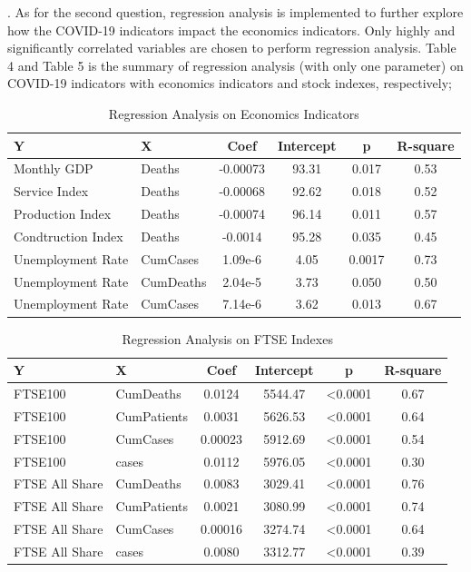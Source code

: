 \documentclass[12pt, a4paper]{report}
\begin{document}
. As for the second question, regression analysis is implemented to further explore how the COVID-19 indicators impact 
the economics indicators. Only highly and significantly correlated variables are chosen to perform regression analysis.
Table 4 and Table 5 is the summary of regression analysis (with only one parameter) on COVID-19 indicators with economics indicators 
and stock indexes, respectively;\par
\noindent

\begin{table}[H]
    \begin{center}
    \caption{Regression Analysis on Economics Indicators}
    \begin{tabular}{llcccc}
        \toprule
        Y&X&Coef&Intercept&p&R-square\\
        \midrule
        Monthly GDP&Deaths&-0.00073&93.31&0.017&0.53\\
        Service Index&Deaths&-0.00068&92.62&0.018&0.52\\
        Production Index&Deaths&-0.00074&96.14&0.011&0.57\\
        Condtruction Index&Deaths&-0.0014&95.28&0.035&0.45\\
        Unemployment Rate&CumCases&1.09e-6&4.05&0.0017&0.73\\
        Unemployment Rate&CumDeaths&2.04e-5&3.73&0.050&0.50\\
        Unemployment Rate&CumCases&7.14e-6&3.62&0.013&0.67\\
        \bottomrule
    \end{tabular}
    \end{center}
\end{table}

\begin{table}[H]
    \begin{center}
    \caption{Regression Analysis on FTSE Indexes}
    \begin{tabular}{llcccc}
        \toprule
        Y&X&Coef&Intercept&p&R-square\\
        \midrule
        FTSE100&CumDeaths&0.0124&5544.47&<0.0001&0.67\\
        FTSE100&CumPatients&0.0031&5626.53&<0.0001&0.64\\
        FTSE100&CumCases&0.00023&5912.69&<0.0001&0.54\\
        FTSE100&cases&0.0112&5976.05&<0.0001&0.30\\
        FTSE All Share&CumDeaths&0.0083&3029.41&<0.0001&0.76\\
        FTSE All Share&CumPatients&0.0021&3080.99&<0.0001&0.74\\
        FTSE All Share&CumCases&0.00016&3274.74&<0.0001&0.64\\
        FTSE All Share&cases&0.0080&3312.77&<0.0001&0.39\\
        \bottomrule
    \end{tabular}
    \end{center}
\end{table}
\end{document}
